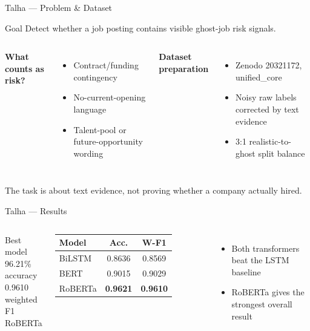 \documentclass[aspectratio=169]{beamer}
\begin{document}

\begin{frame}{Talha — Problem \& Dataset}
\begin{block}{Goal}
Detect whether a job posting contains visible ghost-job risk signals.
\end{block}
\vspace{0.25cm}
\begin{columns}[t]
\textbf{What counts as risk?}
\begin{itemize}
    \item Contract/funding contingency
    \item No-current-opening language
    \item Talent-pool or future-opportunity wording
\end{itemize}
\textbf{Dataset preparation}
\begin{itemize}
    \item Zenodo 20321172, unified\_core
    \item Noisy raw labels corrected by text evidence
    \item 3:1 realistic-to-ghost split balance
\end{itemize}
\end{columns}
\vspace{0.2cm}
{\footnotesize The task is about text evidence, not proving whether a company actually hired.}
\end{frame}

\begin{frame}{Talha — Results}
\begin{columns}[c]
\begin{block}{Best model}
\centering
{\Huge 96.21\%}\\
{\small accuracy}\\[0.25cm]
{\Huge 0.9610}\\
{\small weighted F1}\\[0.15cm]
{\large RoBERTa}
\end{block}
\begin{tabular}{lcc}
\toprule
\textbf{Model} & \textbf{Acc.} & \textbf{W-F1} \\
\midrule
BiLSTM   & 0.8636 & 0.8569 \\
BERT     & 0.9015 & 0.9029 \\
RoBERTa  & \textbf{0.9621} & \textbf{0.9610} \\
\bottomrule
\end{tabular}
\vspace{0.3cm}
\begin{itemize}
    \item Both transformers beat the LSTM baseline
    \item RoBERTa gives the strongest overall result
\end{itemize}
\end{columns}
\end{frame}
\end{document}
